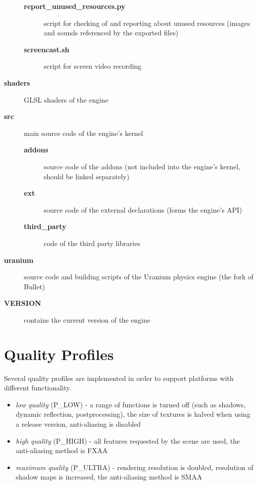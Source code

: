 \documentclass[a4paper,12pt,oneside]{sphinxmanual}
\begin{document}
\begin{description}
\begin{description}
\item[{\textbf{report\_unused\_resources.py}}] \leavevmode
script for checking of and reporting about unused resources (images and sounds referenced by the exported files)

\item[{\textbf{screencast.sh}}] \leavevmode
script for screen video recording

\end{description}

\item[{\textbf{shaders}}] \leavevmode
GLSL shaders of the engine

\item[{\textbf{src}}] \leavevmode
main source code of the engine's kernel
\begin{description}
\item[{\textbf{addons}}] \leavevmode
source code of the addons (not included into the engine's kernel, should be linked separately)

\item[{\textbf{ext}}] \leavevmode
source code of the external declarations (forms the engine's API)

\item[{\textbf{third\_party}}] \leavevmode
code of the third party libraries

\end{description}

\item[{\textbf{uranium}}] \leavevmode
source code and building scripts of the Uranium physics engine (the fork of Bullet)

\item[{\textbf{VERSION}}] \leavevmode
contains the current version of the engine

\end{description}


\section{Quality Profiles}
\label{developers:id11}\label{developers:quality-settings}
Several quality profiles are implemented in order to support platforms with different functionality.
\begin{itemize}
\item {} 
\emph{low quality} (P\_LOW) - a range of functions is turned off (such as shadows, dynamic reflection, postprocessing), the size of textures is halved when using a release version, anti-aliasing is disabled

\item {} 
\emph{high quality} (P\_HIGH) - all features requested by the scene are used, the anti-aliasing method is FXAA

\item {} 
\emph{maximum quality} (P\_ULTRA) - rendering resolution is doubled, resolution of shadow maps is increased, the anti-aliasing method is SMAA

\end{itemize}
\end{document}
